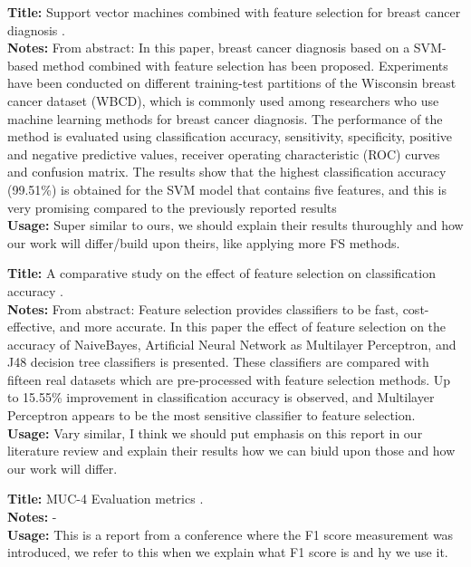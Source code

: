 \documentclass[a4paper]{article}
\begin{document}
\noindent
\textbf{Title:} Support vector machines combined with feature selection for breast cancer diagnosis \cite{akay2009}.
\\
\textbf{Notes:} From abstract: In this paper, breast cancer diagnosis based on a SVM-based method combined with feature selection has been proposed. Experiments have been conducted on different training-test partitions of the Wisconsin breast cancer dataset (WBCD), which is commonly used among researchers who use machine learning methods for breast cancer diagnosis. The performance of the method is evaluated using classification accuracy, sensitivity, specificity, positive and negative predictive values, receiver operating characteristic (ROC) curves and confusion matrix. The results show that the highest classification accuracy (99.51\%) is obtained for the SVM model that contains five features, and this is very promising compared to the previously reported results
\\
\textbf{Usage:} Super similar to ours, we should explain their results thuroughly and how our work will differ/build upon theirs, like applying more FS methods.
\\\par

\noindent
\textbf{Title:} A comparative study on the effect of feature selection on classification accuracy \cite{karabulut2012}.
\\
\textbf{Notes:} From abstract: Feature selection provides classifiers to be fast, cost-effective, and more accurate. In this paper the effect of feature selection on the accuracy of NaiveBayes, Artificial Neural Network as Multilayer Perceptron, and J48 decision tree classifiers is presented. These classifiers are compared with fifteen real datasets which are pre-processed with feature selection methods. Up to 15.55\% improvement in classification accuracy is observed, and Multilayer Perceptron appears to be the most sensitive classifier to feature selection.
\\
\textbf{Usage:} Vary similar, I think we should put emphasis on this report in our literature review and explain their results how we can biuld upon those and how our work will differ.
\\\par

\noindent
\textbf{Title:} MUC-4 Evaluation metrics \cite{muc1992}.
\\
\textbf{Notes:} -
\\
\textbf{Usage:} This is a report from a conference where the F1 score measurement was introduced, we refer to this when we explain what F1 score is and hy we use it.
\\\par
\end{document}

